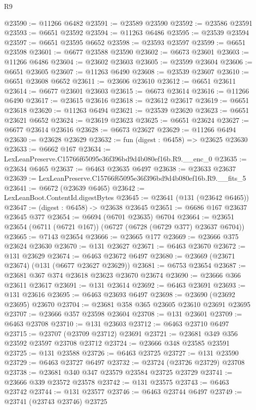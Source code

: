 \begin{lexlean}{R9}
\begin{coremodule}
@23590 := @11266 @6482
@23591 := @23589 @23590
@23592 := @23586 @23591
@23593 := @6651 @23592
@23594 := @11263 @6486
@23595 := @23539 @23594
@23597 := @6651 @23595 @6652
@23598 := @23593 @23597
@23599 := @6651 @23598
@23601 := @6677 @23588 @23590
@23602 := @6673 @23601
@23603 := @11266 @6486
@23604 := @23602 @23603
@23605 := @23599 @23604
@23606 := @6651 @23605
@23607 := @11263 @6490
@23608 := @23539 @23607
@23610 := @6651 @23608 @6652
@23611 := @23606 @23610
@23612 := @6651 @23611
@23614 := @6677 @23601 @23603
@23615 := @6673 @23614
@23616 := @11266 @6490
@23617 := @23615 @23616
@23618 := @23612 @23617
@23619 := @6651 @23618
@23620 := @11263 @6494
@23621 := @23539 @23620
@23623 := @6651 @23621 @6652
@23624 := @23619 @23623
@23625 := @6651 @23624
@23627 := @6677 @23614 @23616
@23628 := @6673 @23627
@23629 := @11266 @6494
@23630 := @23628 @23629
@23632 := fun (digest : @6458) => @23625 @23630
@23633 := @6662 @167
@23634 := LexLeanPreserve.C15766f65095e36f396bd9d4b080ef16b.R9.__enc_0
@23635 := @23634 @6465
@23637 := @6463 @23635 @6497
@23638 := @23633 @23637
@23639 := LexLeanPreserve.C15766f65095e36f396bd9d4b080ef16b.R9.__fits_5
@23641 := @6672 (@23639 @6465)
@23642 := LexLeanBoot.ContentId.digestBytes
@23645 := @23641 (@131 (@23642 @6465))
@23647 := (digest : @6458) -> @23638 @23645
@23651 := @6686 @167 @23637 @23645 @377
@23654 := @6694 (@6701 @23635) @6704
@23664 := @23651 @23654 (@6711 (@6721 @167)) (@6727 (@6728 (@6729 @377) @23637 @6704))
@23665 := @7143 @23654
@23666 := @23665 @177
@23669 := @23666 @375 @23624 @23630
@23670 := @131 @23627
@23671 := @6463 @23670
@23672 := @131 @23629
@23674 := @6463 @23672 @6497
@23680 := @23669 (@23671 @23674) (@131 (@6677 @23627 @23629))
@23681 := @6753 @23654
@23687 := @23681 @367 @374 @23618 @23623 @23670 @23674
@23690 := @23666 @366 @23611 @23617
@23691 := @131 @23614
@23692 := @6463 @23691
@23693 := @131 @23616
@23695 := @6463 @23693 @6497
@23698 := @23690 (@23692 @23695) @23670
@23704 := @23681 @358 @365 @23605 @23610 @23691 @23695
@23707 := @23666 @357 @23598 @23604
@23708 := @131 @23601
@23709 := @6463 @23708
@23710 := @131 @23603
@23712 := @6463 @23710 @6497
@23715 := @23707 (@23709 @23712) @23691
@23721 := @23681 @349 @356 @23592 @23597 @23708 @23712
@23724 := @23666 @348 @23585 @23591
@23725 := @131 @23588
@23726 := @6463 @23725
@23727 := @131 @23590
@23729 := @6463 @23727 @6497
@23732 := @23724 (@23726 @23729) @23708
@23738 := @23681 @340 @347 @23579 @23584 @23725 @23729
@23741 := @23666 @339 @23572 @23578
@23742 := @131 @23575
@23743 := @6463 @23742
@23744 := @131 @23577
@23746 := @6463 @23744 @6497
@23749 := @23741 (@23743 @23746) @23725

\end{coremodule}
\end{lexlean}
